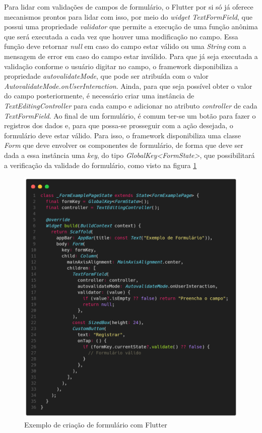 \documentclass[12pt, %
openright, 
oneside, %
a4paper,    %
brazil]{facom-ufu-abntex2}
\begin{document}
Para lidar com validações de campos de formulário, o Flutter por si só já oferece mecanismos prontos para lidar com isso, por meio do \textit{widget} \textit{TextFormField}, que possui uma propriedade \textit{validator} que permite a execução de uma função anônima que será executada a cada vez que houver uma modificação no campo. Essa função deve retornar \textit{null} em caso do campo estar válido ou uma \textit{String} com a mensagem de error em caso do campo estar inválido. Para que já seja executada a validação conforme o usuário digitar no campo, o framework disponibiliza a propriedade \textit{autovalidateMode}, que pode ser atribuída com o valor \textit{AutovalidateMode.onUserInteraction}. Ainda, para que seja possível obter o valor do campo posteriormente, é necessário criar uma instância de \textit{TextEditingController} para cada campo e adicionar no atributo \textit{controller} de cada \textit{TextFormField}. Ao final de um formulário, é comum ter-se um botão para fazer o registros dos dados e, para que possa-se prosseguir com a ação desejada, o formulário deve estar válido. Para isso, o framework disponibiliza uma classe \textit{Form} que deve envolver os componentes de formulário, de forma que deve ser dada a essa instância uma \textit{key}, do tipo \textit{GlobalKey<FormState>}, que possibilitará a verificação da validade do formulário, como visto na figura \ref{fig:example_form}

\begin{figure}[ht]
    \centering
    \includegraphics[width=.65\textwidth, trim={0 30 0 100}, clip]{figures/forms/example_form.png}
    \caption{Exemplo de criação de formulário com Flutter}
    \label{fig:example_form}
\end{figure}
\end{document}
